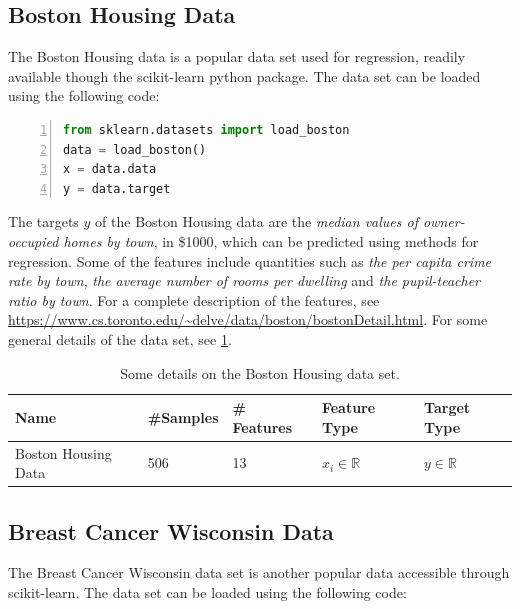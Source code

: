\subsection{Boston Housing Data}\label{sec:Boston Housing Data}
The Boston Housing data is a popular data set used for regression, readily available though the scikit-learn python package\cite{scikit-learn}. The data set can be loaded using the following code:

\begin{lstlisting}[language=python, numbers=left]
from sklearn.datasets import load_boston
data = load_boston()
x = data.data
y = data.target
\end{lstlisting}

The targets $y$ of the Boston Housing data are the \emph{median values of owner-occupied homes by town}, in \$1000, which can be predicted using methods for regression. Some of the features include quantities such as \emph{the per capita crime rate by town}, \emph{the average number of rooms per dwelling} and \emph{the pupil-teacher ratio by town}. For a complete description of the features, see \url{https://www.cs.toronto.edu/~delve/data/boston/bostonDetail.html}. For some general details of the data set, see \cref{tab:Boston}.

\begin{table}[H]
\begin{tabular}{|l|l|l|l|l|}
\hline
 Name& \#Samples&  \# Features& Feature Type& Target Type \\ \hline
 Boston Housing Data&  506&  13& $x_i \in \mathbb{R}$ & $y \in \mathbb{R}$  \\ 
 \hline
 
\end{tabular}
\caption{Some details on the Boston Housing data set.}
\label{tab:Boston}
\end{table}

\subsection{Breast Cancer Wisconsin Data}\label{sec:Breast Cancer Data}

The Breast Cancer Wisconsin data set is another popular data accessible through scikit-learn. The data set can be loaded using the following code:

